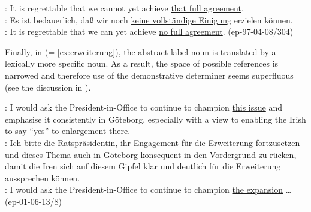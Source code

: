 \documentclass[output=paper]{LSP/langsci}
\begin{document}
\ea \label{ex:kein}%
\ENo: It is regrettable that we cannot yet achieve \ul{that full agreement}. \\
\DEt: Es ist bedauerlich, da{\ss} wir noch \ul{keine vollst\"andige Einigung} erzielen k\"onnen. \\
\DElit: It is regrettable that we can yet achieve \ul{no full agreement}. 
\hfill{(ep-97-04-08/304)}
\z



Finally, in  (= \ref{ex:erweiterung}), the abstract label noun is translated by a lexically more specific noun. As a result, the space of possible references is narrowed and therefore use of the demonstrative determiner seems superfluous (see the discussion in ). 

\ea \label{ex:erweiterung2}
\ENo: I would ask the President-in-Office to continue to champion \ul{this issue}  and emphasise it consistently in G\"oteborg, especially with a view to enabling the Irish to say ``yes'' to enlargement there. \\
\DEt: Ich bitte die Ratspr\"asidentin, ihr Engagement f\"ur \ul{die Erweiterung} fortzusetzen  und dieses Thema auch in G\"oteborg konsequent in den Vordergrund zu r\"ucken, damit die Iren sich auf diesem Gipfel klar und deutlich f\"ur die Erweiterung aussprechen k\"onnen.\\
\DElit: I would ask the President-in-Office to continue to champion \ul{the expansion} \dots
 \hfill{(ep-01-06-13/8)}
\z
\end{document}
